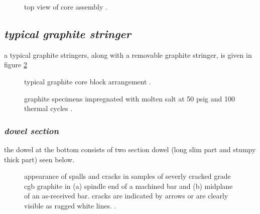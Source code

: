 \documentclass[ms,a4paper]{memoir}
\newcommand*{\mrsarchive}{../../msr-archive}%
\begin{document}
\begin{figure}[H]
  \centering
  \centering
  \caption{top view of core assembly \parencite[figure 1.4]{ornl-4676}.}
  \label{4676-fig1-6}
\end{figure}

\subsection{\emph{typical graphite stringer}}
a typical graphite stringers, along with a removable graphite stringer, is given in figure \ref{3229-fig2}
\begin{figure}[H]
  \centering
  \centering
  \caption{typical graphite core block arrangement \parencite[figure 2]{ornl-tm-3229}.}
  \label{3229-fig2}
\end{figure}

\begin{figure}[H]
  \centering
  \caption{graphite specimens impregnated with molten salt at
50 psig and 100 thermal cycles \parencite[figure 4.3]{ornl-3419}.}
\end{figure}

\subsubsection{\emph{dowel section}}
the dowel at the bottom consists of two section dowel (long slim part and stumpy thick part) seen below.
\begin{figure}[H]
  \centering
  \caption{appearance of spalls and cracks in samples of severly cracked grade cgb graphite in (a) spindle end of a machined bar and (b) midplane of an as-received bar. cracks are indicated by arrows or are clearly visible as ragged white lines. \parencite[figure 4]{ornl-3708}.}
  \label{3708-fig4}
\end{figure}
\end{document}
